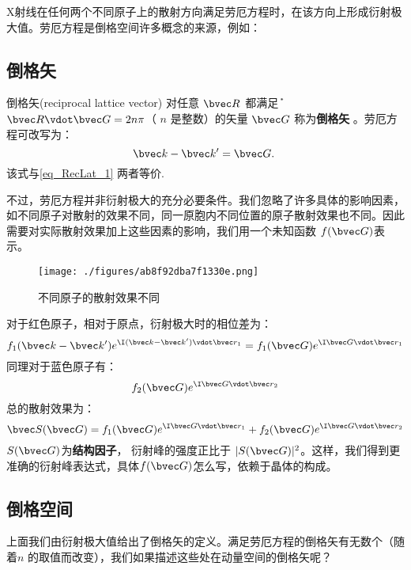 X射线在任何两个不同原子上的散射方向满足劳厄方程时，在该方向上形成衍射极大值。劳厄方程是倒格空间许多概念的来源，例如：

\subsection{倒格矢}
\begin{definition}{倒格矢(reciprocal lattice vector)}
对任意 $\bvec R$ 都满足݊ $\bvec R \vdot \bvec G = 2 n \pi$（ $n$ 是整数）的矢量 $\bvec G$ 称为\textbf{倒格矢}
 。劳厄方程可改写为：
\begin{equation}
\bvec k -\bvec k' = \bvec G.~
\end{equation}
该式与\autoref{eq_RecLat_1} 两者等价.
\end{definition}

不过，劳厄方程并非衍射极大的充分必要条件。我们忽略了许多具体的影响因素，如不同原子对散射的效果不同，同一原胞内不同位置的原子散射效果也不同。因此需要对实际散射效果加上这些因素的影响，我们用一个未知函数 $f(\bvec G)$表示。

\begin{figure}[ht]
\centering
\texttt{[image: ./figures/ab8f92dba7f1330e.png]}
\caption{不同原子的散射效果不同} \label{fig_RecLat_4}
\end{figure}

对于红色原子，相对于原点，衍射极大时的相位差为：
\begin{equation}
f_1(\bvec k -\bvec k') e^{\I (\bvec k -\bvec k') \vdot \bvec r_1} =f_1(\bvec G) e^{\I \bvec G \vdot \bvec r_1}
\end{equation}
同理对于蓝色原子有：
\begin{equation}
f_2(\bvec G) e^{\I \bvec G \vdot \bvec r_2}
\end{equation}
总的散射效果为：
\begin{equation}
\bvec S (\bvec G) = f_1(\bvec G) e^{\I \bvec G \vdot \bvec r_1} + f_2(\bvec G) e^{\I \bvec G \vdot \bvec r_2}
\end{equation}
$S (\bvec G)$为\textbf{结构因子}， 衍射峰的强度正比于 $|S(\bvec G)|^2$。这样，我们得到更准确的衍射峰表达式，具体$f(\bvec G)$怎么写，依赖于晶体的构成。

\subsection{倒格空间}
上面我们由衍射极大值给出了倒格矢的定义。满足劳厄方程的倒格矢有无数个（随着$n$ 的取值而改变），我们如果描述这些处在动量空间的倒格矢呢？

